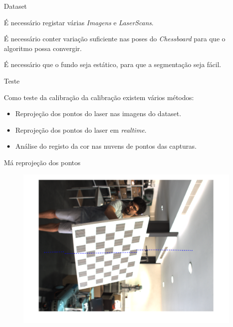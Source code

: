 \begin{frame}{Dataset}

    É necessário registar várias \textit{Imagens} e \textit{LaserScans}.

    É necessário conter variação suficiente nas poses do \textit{Chessboard} para que o algoritmo possa convergir.

    É necessário que o fundo seja estático, para que a segmentação seja fácil.

\end{frame}

\begin{frame}{Teste}
    
    Como teste da calibração da calibração existem vários métodos:

    \begin{itemize}
        \item Reprojeção dos pontos do laser nas imagens do dataset.
        \item Reprojeção dos pontos do laser em \textit{realtime}.
        \item Análise do registo da cor nas nuvens de pontos das capturas.
    \end{itemize}

\end{frame}

\begin{frame}{Má reprojeção dos pontos}
    
    \centering
    \begin{figure}
        \includegraphics[angle=90, width=0.6\textheight]{img/radlocc_bad_calibration.png}
    \end{figure}

\end{frame}

